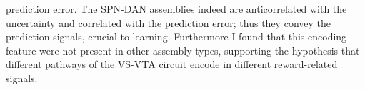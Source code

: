 prediction error. The SPN-DAN assemblies indeed are anticorrelated with the uncertainty and correlated with the prediction error; thus they convey the prediction signals, crucial to learning. Furthermore I found that this encoding feature were not present in other assembly-types, supporting the hypothesis that different pathways of the VS-VTA circuit encode in different reward-related signals.